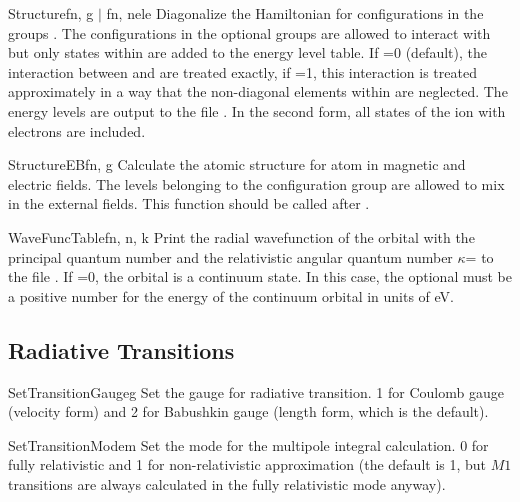 \begin{fundesc}{Structure}{fn, g $\mid$ fn, nele}
Diagonalize the Hamiltonian for configurations in the groups . The
configurations in the optional groups  are allowed to interact with
 but only states within  are added to the energy level table. If
=0 (default), the interaction between  and  are treated
exactly, if =1, this interaction is treated approximately in a way that
the non-diagonal elements within  are neglected. The energy levels are
output to the file . In the second form, all states of the ion with
 electrons are included.
\end{fundesc}

\begin{fundesc}{StructureEB}{fn, g}
Calculate the atomic structure for atom in magnetic and electric fields. The
levels belonging to the configuration group  are allowed to mix in the
external fields. This function should be called after .
\end{fundesc}

\begin{fundesc}{WaveFuncTable}{fn, n, k}
Print the radial wavefunction of the orbital with the principal quantum number
 and the relativistic angular quantum number $\kappa$= to the file
. If =0, the orbital is a continuum state. In this case, the
optional  must be a positive number for the energy of the continuum
orbital in units of eV.
\end{fundesc}


\subsection{Radiative Transitions}

\begin{fundesc}{SetTransitionGauge}{g}
Set the gauge for radiative transition. 1 for Coulomb gauge (velocity form) and
2 for Babushkin gauge (length form, which is the default).
\end{fundesc}

\begin{fundesc}{SetTransitionMode}{m}
Set the mode for the multipole integral calculation. 0 for fully relativistic
and 1 for non-relativistic approximation (the default is 1, but $M1$ transitions
are always calculated in the fully relativistic mode anyway).
\end{fundesc}

